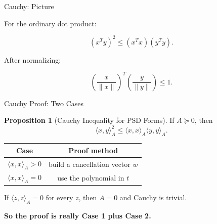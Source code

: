 \documentclass[10pt]{beamer}
\theoremstyle{definition}
\newtheorem{prop}{Proposition}[section]
\newcommand{\x}[1]{\alert{\textbf{#1}}}
\begin{document}
\begin{frame}{Cauchy: Picture}

For the ordinary dot product:

$$
(x^Ty)^2\le (x^Tx)(y^Ty).
$$

\vfill

After normalizing:

$$
\left(\frac{x}{\|x\|}\right)^T
\left(\frac{y}{\|y\|}\right)
\le 1.
$$

\vfill

\begin{center}
\end{center}

\end{frame}


\begin{frame}{Cauchy Proof: Two Cases}

\begin{prop}[Cauchy Inequality for PSD Forms]
If $A\succeq0$, then
$$
\boxed{\langle x,y\rangle_A^2
\le
\langle x,x\rangle_A\langle y,y\rangle_A.}
$$
\end{prop}

\vfill

\begin{center}
\renewcommand{\arraystretch}{1.35}
\begin{tabular}{c|c}
\textbf{Case} & \textbf{Proof method}\\
\hline
$\langle x,x\rangle_A>0$ & build a cancellation vector $w$\\
$\langle x,x\rangle_A=0$ & use the polynomial in $t$
\end{tabular}
\end{center}

\vfill

If $\langle z,z\rangle_A=0$ for every $z$, then $A=0$ and Cauchy is trivial.

\vfill

\begin{center}
\x{So the proof is really Case 1 plus Case 2.}
\end{center}

\end{frame}
\end{document}
